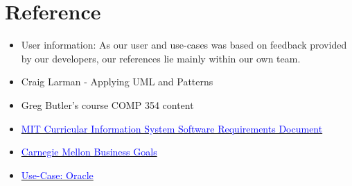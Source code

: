 \documentclass[12pt]{article}
\begin{document}
\clearpage

\section{Reference}

\begin{itemize}
\item User information: As our user and use-cases was based on feedback provided by our developers, our references lie mainly within our own team.
\item Craig Larman - Applying UML and Patterns
\item Greg Butler's course COMP 354 content
\item \href{http://web.mit.edu/ssit/cis/CISRequirements.html}{\textcolor{blue}{MIT Curricular Information System
Software Requirements Document}}
\item \href{https://resources.sei.cmu.edu/asset_files/TechnicalReport/2005_005_001_14621.pdf}{\textcolor{blue}{Carnegie Mellon Business Goals}}
\item \href{http://www.oracle.com/technetwork/testcontent/gettingstartedwithusecasemodeling-133857.pdf}{\textcolor{blue}{Use-Case: Oracle }}

\end{itemize}
\end{document}

